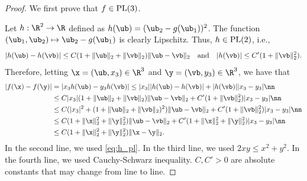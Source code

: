 \begin{proof}
We first prove that $f\in\rm{PL}(3)$.

Let $h:\R^2\rightarrow\R$ defined as $h(\ub)=(\ub_2-g(\ub_1))^2$. The function $(\ub_1,\ub_2)\mapsto\ub_2-g(\ub_1)$ is clearly Lipschitz. Thus, $h\in\rm{PL}(2)$, i.e., 
\begin{align}
|h(\ub)-h(\vb)| \leq C(1+\|\ub\|_2+\|\vb\|_2)\|\ub-\vb\|_2\quad\text{and}\quad |h(\vb)|\leq C'(1+\|\vb\|_2^2).\label{eq:h_pl}
\end{align} 
Therefore, letting $\x=(\ub,x_3)\in\R^3$ and $\y=(\vb,y_3)\in\R^3$, we have that 
\begin{align}
|f(\x)-f(\y)| &= |x_3h(\ub) - y_3h(\vb)| \leq |x_3||h(\ub)-h(\vb)| + |h(\vb)| |x_3-y_3|\nn\\
&\leq C|x_3|(1+\|\ub\|_2+\|\vb\|_2)\|\ub-\vb\|_2 + C'(1+\|\vb\|_2^2)|x_3-y_3| \nn\\
&\leq C(|x_3|^2+(1+\|\ub\|_2+\|\vb\|_2)^2)\|\ub-\vb\|_2 + C'(1+\|\vb\|_2^2)|x_3-y_3| \nn\\
&\leq C(1+\|\x\|_2^2+\|\y\|_2^2)\|\ub-\vb\|_2 + C'(1+\|\x\|_2^2+\|\y\|_2^2)|x_3-y_3| \nn\\
&\leq C(1+\|\x\|_2^2+\|\y\|_2^2)\|\x-\y\|_2.
\end{align}
In the second line, we used \eqref{eq:h_pl}. In the third line, we used $2xy\leq x^2+y^2$. In the fourth line, we used Cauchy-Schwarz inequality. $C,C'>0$ are absolute constants that may change from line to line.


\end{proof}
